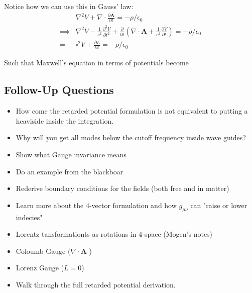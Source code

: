 Notice how we can use this in Gauss' law: \begin{align*}
    &\nabla ^{2} V + \nabla \cdot \frac{\partial \mathbf{A}}{\partial t} = -\rho  /\epsilon_0\\
    \implies &\nabla ^{2} V - \frac{1}{c^{2} }\frac{\partial^{2}  V}{\partial t^{2} }  + \frac{\partial }{\partial t}\left( \nabla \cdot \mathbf{A} + \frac{1}{c^{2} }\frac{\partial V}{\partial t}  \right)   = -\rho  /\epsilon_0\\
    =\ & \boxed{\square^{2}V + \frac{\partial L}{\partial t} = - \rho /\epsilon _0}
\end{align*}

Such that Maxwell's equation in terms of potentials become 



\subsection*{Follow-Up Questions}
\begin{itemize}
    \item How come the retarded potential formulation is not equivalent to putting a heaviside inside the integration.
    \item Why will you get all modes below the cutoff frequency inside wave guides?
    \item Show what Gauge invariance means
    \item Do an example from the blackboar
    \item Rederive boundary conditions for the fields (both free and in matter)
    \item Learn more about the 4-vector formulation and how \(g_{\mu \nu}\) can "raise or lower indecies"
    \item Lorentz tansformationts as rotations in 4-space (Mogen's notes)
    \item Coloumb Gauge (\(\nabla \cdot \mathbf{A}\) )
    \item Lorenz Gauge (\(L = 0\))
    \item Walk through the full retarded potential derivation.  
\end{itemize}
